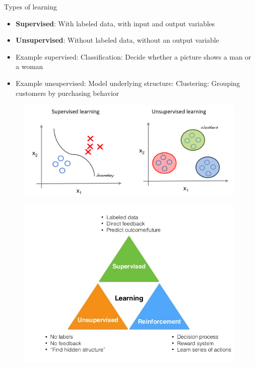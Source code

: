 \documentclass{beamer}
\begin{document}
	\begin{frame}{Types of learning}
		\begin{itemize}
			\item \textbf{Supervised}: With labeled data, with input and output variables
			\item \textbf{Unsupervised}: Without labeled data, without an output variable
			\newline
			\item Example supervised: Classification: Decide whether a picture shows a man or a woman 
			\item Example unsupervised:	Model underlying structure: Clustering: Grouping customers by purchasing behavior
		\end{itemize}
	\end{frame}
    \begin{frame}
    \begin{figure}
        \includegraphics[width = .9\linewidth]{figures/introduction/supervised_unsupervised}
    \end{figure}
    \end{frame}
    
    \begin{frame}
        \begin{figure}
            \includegraphics[width = .9\linewidth]{figures/introduction/type_machine_learning}
    \end{figure}
    \end{frame}
\end{document}
